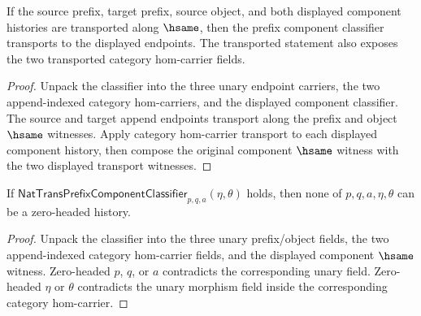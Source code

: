 \begin{theorem}
\label{thm:nattrans-prefix-component-classifier-hsame-transport}
If the source prefix, target prefix, source object, and both displayed
component histories are transported along $\hsame$, then the prefix component
classifier transports to the displayed endpoints. The transported statement
also exposes the two transported category hom-carrier fields.
\end{theorem}
\begin{proof}
Unpack the classifier into the three unary endpoint carriers, the two
append-indexed category hom-carriers, and the displayed component classifier.
The source and target append endpoints transport along the prefix and object
$\hsame$ witnesses. Apply category hom-carrier transport to each displayed
component history, then compose the original component $\hsame$ witness with
the two displayed transport witnesses.
\end{proof}

\begin{theorem}
\label{thm:nattrans-prefix-component-classifier-zero-headed-component-absurd}
If
\(\mathsf{NatTransPrefixComponentClassifier}_{p,q,a}(\eta,\theta)\) holds,
then none of \(p,q,a,\eta,\theta\) can be a zero-headed history.
\end{theorem}
\begin{proof}
Unpack the classifier into the three unary prefix/object fields, the two
append-indexed category hom-carrier fields, and the displayed component
\(\hsame\) witness. Zero-headed \(p\), \(q\), or \(a\) contradicts the
corresponding unary field. Zero-headed \(\eta\) or \(\theta\) contradicts the
unary morphism field inside the corresponding category hom-carrier.
\end{proof}

